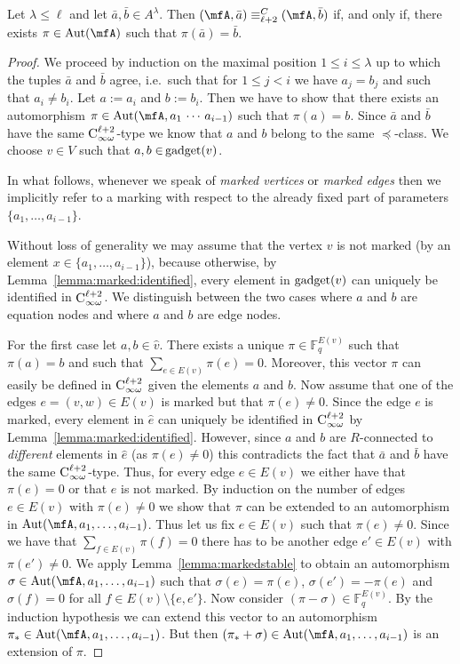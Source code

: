 \documentclass[a4paper,UKenglish]{lipics}
\newcommand{\defeq}{:=}
\newcommand{\field}[1]{\mathbb{#1}}
\newcommand{\Aut}{\ensuremath{\text{Aut}}\xspace}
\newcommand{\logic}[1]{\ensuremath{\textsc{#1}}\xspace}
\newcommand{\INFCkx}[1]{\ensuremath{\logic{C}^{#1}_{\infty\omega}}\xspace}
\newcommand{\Ckeqvx}[1]{\ensuremath{\equiv^C_{#1}}\xspace}
\newcommand{\ba}{{\bar a}}
\newcommand{\bb}{{\bar b}}
\theoremstyle{plain}
\begin{document}
\begin{lemma}\label{lemma:slvclass:orbit:ckeqv}
 Let $\lambda \leq \ell$ and let $\ba, \bb \in A^\lambda$.
 Then $(\mfA,\ba) \Ckeqvx{\ell+2} (\mfA,\bb)$ if, and only if, there exists 
$\pi \in \Aut(\mfA)$ such that $\pi(\ba) = \bb$.
\end{lemma}
\begin{proof}
We proceed by induction on the maximal position $1 \leq i \leq \lambda$ up to 
which the tuples $\ba$ and $\bb$ agree, i.e.\ such that for $1 \leq j < i$ we 
have $a_j = b_j$ and such that $a_i \neq b_i$.
Let $a \defeq a_i$ and $b \defeq b_i$. 
Then we have to show that there exists an automorphism 
$\pi \in \Aut (\mfA, a_1 \, \cdots \, a_{i-1} )$ such that 
$\pi(a) = b$.
Since $\ba$ and $\bb$ have the same $\INFCkx{\ell +2}$-type we know that 
$a$ and $b$ belong to the same $\preceq$-class. 
We choose $v \in V$ such that $a,b \in \,\gadget(v)$. 

In what follows, whenever we speak of \emph{marked vertices} or 
\emph{marked edges} then we implicitly refer to a marking with respect to 
the already fixed part of parameters $\{ a_1, \dots, a_{i-1} \}$.

Without loss of generality we may assume that the vertex $v$ is not 
marked (by an element $x \in \{ a_1, \dots, a_{i-1} \}$), because otherwise, by 
Lemma~\ref{lemma:marked:identified}, every element in $\gadget(v)$ can 
uniquely be identified in $\INFCkx{\ell+2}$.
We distinguish between the two cases where $a$ and $b$ are equation nodes 
and where $a$ and $b$ are edge nodes.

For the first case let $a, b \in \hat v$.
There exists a unique $\pi \in \field F_q^{E(v)}$ such that 
$\pi(a) = b$ and such that $\sum_{e \in E(v)} \pi(e) = 0$.
Moreover, this vector $\pi$ can easily be defined in 
$\INFCkx{\ell+2}$ given the elements $a$ and $b$. 
Now assume that one of the edges $e = (v,w) \in E(v)$ is marked but that 
$\pi(e)\neq 0$. 
Since the edge $e$ is marked, every element in $\hat{e}$ can uniquely be 
identified in $\INFCkx{\ell+2}$ 
by Lemma~\ref{lemma:marked:identified}.
However, since $a$ and $b$ are $R$-connected to \emph{different} elements 
in $\hat{e}$ (as $\pi(e) \neq 0$) this 
contradicts the fact that $\ba$ and $\bb$ have the same $\INFCkx{\ell 
+2}$-type.
Thus, for every edge $e \in E(v)$ we either have that $\pi(e) = 0$ or that $e$ 
is not marked. By induction on the number of edges $e \in E(v)$ with 
$\pi(e)\neq 0$ we show that $\pi$ can be extended to an 
automorphism in $\Aut(\mfA, a_1, \dots, a_{i-1})$.
Thus let us fix $e \in E(v)$ such that $\pi(e) \neq 0$. Since we have 
that $\sum_{f 
\in E(v)} \pi(f) = 0$ there has to be another edge $e' \in E(v)$ with $\pi(e') 
\neq 0$. We apply 
Lemma~\ref{lemma:markedstable}
to obtain an automorphism $\sigma \in \Aut(\mfA, a_1, \dots, a_{i-1})$ such 
that 
$\sigma(e) = \pi(e)$, $\sigma(e') = -\pi(e)$ and $\sigma(f) = 0$ for all $f \in 
E(v)\setminus \{ e, e'\}$.
Now consider $(\pi - \sigma) \in \field F_q^{E(v)}$. By the 
induction 
hypothesis we can extend this vector to an automorphism 
$\pi_* \in \Aut(\mfA, a_1, \dots, a_{i-1})$. But then $(\pi_* + \sigma) \in 
\Aut(\mfA, a_1, \dots, a_{i-1})$ is an extension of $\pi$.


\end{proof}
\end{document}
